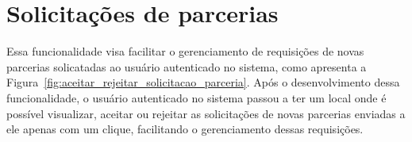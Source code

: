 \section{Solicitações de parcerias}

Essa funcionalidade visa facilitar o gerenciamento de requisições de novas parcerias solicatadas ao usuário autenticado no sistema, como apresenta a Figura~\ref{fig:aceitar_rejeitar_solicitacao_parceria}. Após o desenvolvimento dessa funcionalidade, o usuário autenticado no sistema passou a ter um local onde é possível visualizar, aceitar ou rejeitar as solicitações de novas parcerias enviadas a ele apenas com um clique, facilitando o gerenciamento dessas requisições.

